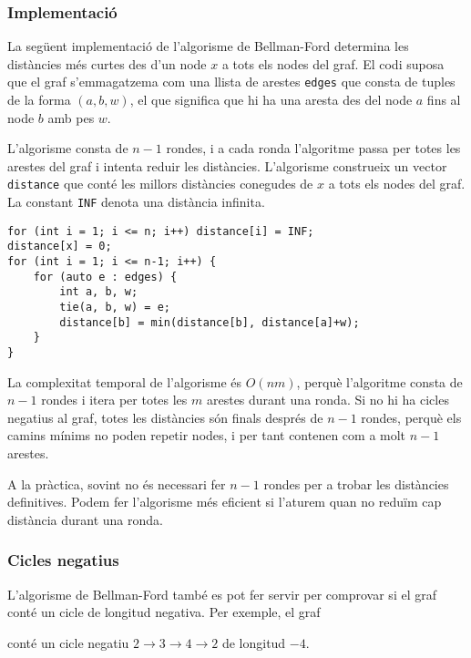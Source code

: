 \subsubsection{Implementació}

La següent implementació de l'algorisme de Bellman-Ford determina les
distàncies més curtes des d'un node $x$ a tots els nodes del graf. El
codi suposa que el graf s'emmagatzema com una llista de arestes
\texttt{edges} que consta de tuples de la forma $(a,b,w)$, el que
significa que hi ha una aresta des del node $a$ fins al node $b$ amb
pes $w$.

L'algorisme consta de $n-1$ rondes, i a cada ronda l'algoritme passa
per totes les arestes del graf i intenta reduir les
distàncies. L'algorisme construeix un vector \texttt{distance} que
conté les millors distàncies conegudes de $x$ a tots els nodes del
graf. La constant \texttt{INF} denota una distància infinita.


\begin{lstlisting}
for (int i = 1; i <= n; i++) distance[i] = INF;
distance[x] = 0;
for (int i = 1; i <= n-1; i++) {
    for (auto e : edges) {
        int a, b, w;
        tie(a, b, w) = e;
        distance[b] = min(distance[b], distance[a]+w);
    }
}
\end{lstlisting}


La complexitat temporal de l'algorisme és $O(nm)$, perquè l'algoritme
consta de $n-1$ rondes i itera per totes les $m$ arestes durant una
ronda. Si no hi ha cicles negatius al graf, totes les distàncies són
finals després de $n-1$ rondes, perquè els camins mínims no poden
repetir nodes, i per tant contenen com a molt $n-1$ arestes.

A la pràctica, sovint no és necessari fer $n-1$ rondes per a trobar
les distàncies definitives. Podem fer l'algorisme més eficient si
l'aturem quan no reduïm cap distància durant una ronda.

\subsubsection{Cicles negatius}


L'algorisme de Bellman-Ford també es pot fer servir per comprovar si
el graf conté un cicle de longitud negativa. Per exemple, el graf


\begin{center}
\end{center}
\noindent conté un cicle negatiu $2 \rightarrow 3 \rightarrow 4
\rightarrow 2$ de longitud $-4$.

